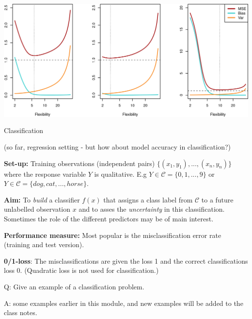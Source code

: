 \documentclass[ignorenonframetext,]{beamer}
\begin{document}
\begin{frame}

\includegraphics{../ISLR/Chapter2/2.12.png}

\end{frame}

\begin{frame}{Classification}

(so far, regression setting - but how about model accuracy in
classification?)

\textbf{Set-up:} Training observations (independent pairs)
\(\{(x_1, y_1), ..., (x_n, y_n)\}\) where the response variable \(Y\) is
qualitative. E.g \(Y \in \mathcal{C} = \{0, 1, ..., 9\}\) or
\(Y \in \mathcal{C} = \{dog, cat,... ,horse\}\).

\textbf{Aim: } To \emph{build} a classifier \(f(x)\) that assigns a
class label from \(\mathcal{C}\) to a future unlabelled observation
\(x\) and to asses the \emph{uncertainty} in this classification.
Sometimes the role of the different predictors may be of main interest.

\textbf{Performance measure:} Most popular is the misclassification
error rate (training and test version).

\textbf{0/1-loss}: The misclassifications are given the loss 1 and the
correct classifications loss 0. (Quadratic loss is not used for
classification.)

\begin{block}{Q: Give an example of a classification problem.}

\end{block}

\end{frame}

\begin{frame}

\begin{block}{A: some examples earlier in this module, and new examples
will be added to the class notes.}

\end{block}

\end{frame}
\end{document}
